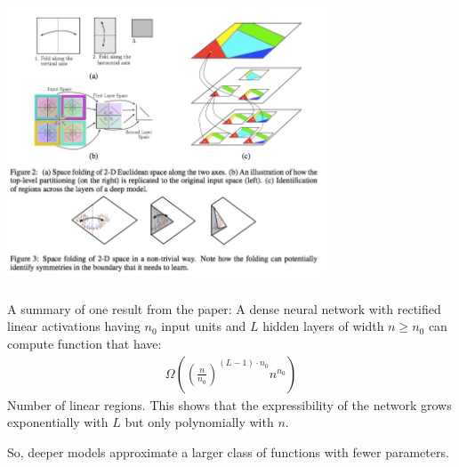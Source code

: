 \documentclass[xetex,mathserif,serif,aspectratio=169]{beamer}
\begin{document}
\begin{frame}[fragile] \frametitle{} \oldB \small

\begin{center}
\includegraphics[height=8cm]{img/linearUnits.jpg}
\end{center}

\end{frame}

\begin{frame}[fragile] \frametitle{} \oldB \small

A summary of one result from the paper: A dense
neural network with rectified linear activations having
$n_0$ input units and $L$ hidden layers of width $n \geq n_0$
can compute function that have:
\begin{align*}
\Omega \left( \left(\frac{n}{n_0} \right)^{(L-1) \cdot n_0} n^{n_0} \right)
\end{align*}
Number of linear regions. This shows that the expressibility
of the network grows exponentially with $L$ but only polynomially
with $n$.

So, deeper models approximate a larger class of functions with
fewer parameters.

\end{frame}
\end{document}
